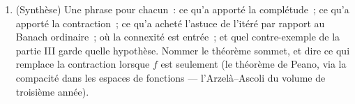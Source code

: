 \begin{problem}
\begin{enumerate}[resume]
        segment $\intcc{A}{B}$, adapter la question 8 pour montrer
        que la majoration factorielle vaut sur le segment
        \emph{entier}, donc existence et unicité sont globales
        là-dessus --- le cas scalaire du théorème de
        Cauchy--Lipschitz du~\cref{ch:b2:diffeq}, sans restriction
        sur la longueur $B - A$.
  \item (Synthèse) Une phrase pour chacun~: ce qu'a apporté la
        complétude~; ce qu'a apporté la contraction~; ce qu'a
        acheté l'astuce de l'itéré par rapport au Banach ordinaire~;
        où la connexité est entrée~; et quel contre-exemple de la
        partie III garde quelle hypothèse. Nommer le théorème sommet,
        et dire ce qui remplace la contraction lorsque $f$ est
        seulement  (le théorème de Peano, via la compacité
        dans les espaces de fonctions --- l'Arzelà--Ascoli du volume
        de troisième année).
\end{enumerate}
\end{problem}

